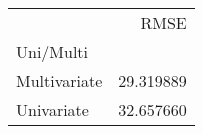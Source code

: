 \begin{tabular}{lr}
\toprule
 & RMSE \\
Uni/Multi &  \\
\midrule
Multivariate & 29.319889 \\
Univariate & 32.657660 \\
\bottomrule
\end{tabular}

